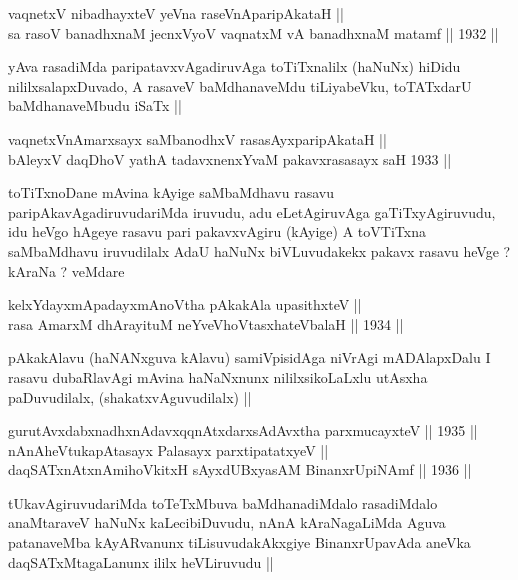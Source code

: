\begin{shl}
vaqnetxV nibadhayxteV yeVna raseVnA\s \s paripAkataH ||  \\
sa rasoV banadhxnaM jecnxVyoV vaqnatxM vA banadhxnaM matamf ||  1932 || 
\end{shl}

\begin{artha}
yAva rasadiMda paripatavxvAgadiruvAga toTiTxnalilx (haNuNx) hiDidu
nililxsalapxDuvado, A rasaveV baMdhanaveMdu tiLiyabeVku, toTATxdarU
baMdhanaveMbudu iSaTx ||
\end{artha}

\begin{shl}
vaqnetxVnA\s \s marxsayx saMbanodhxV rasasAyx\s \s paripAkataH || \\
bAleyxV daqDhoV yathA tadavxnenxYvaM pakavxrasasayx saH 1933 ||  
\end{shl}

\begin{artha}
toTiTxnoDane mAvina kAyige saMbaMdhavu rasavu
paripAkavAgadiruvudariMda iruvudu, adu eLetAgiruvAga gaTiTxyAgiruvudu,
idu heVgo hAgeye rasavu pari pakavxvAgiru (kAyige) A toVTiTxna
saMbaMdhavu iruvudilalx AdaU haNuNx biVLuvudakekx pakavx rasavu heVge
? kAraNa ? veMdare 
\end{artha}

\begin{shl}
kelxYdayxmApadayxmAnoV\s tha pAkakAla upasithxteV || \\
rasa AmarxM dhArayituM neYveVhoVtasxhateV\s balaH ||  1934 ||  
\end{shl}

\begin{artha}
pAkakAlavu (haNANxguva kAlavu) samiVpisidAga niVrAgi mADAlapxDalu I
rasavu dubaRlavAgi mAvina haNaNxnunx nililxsikoLaLxlu utAsxha
paDuvudilalx, (shakatxvAguvudilalx) ||
\end{artha}

\begin{shl}
gurutAvxdabxnadhxnAdavxqqnAtxdarxsAdAvx\s tha parxmucayxteV ||  1935 ||   \\
nAnAheVtukapAtasayx Palasayx parxtipatatxyeV ||  \\
daqSATxnAtxnAmihoVkitxH sAyxdUBxyasAM BinanxrUpiNAmf ||  1936 ||  
\end{shl}

\begin{artha}
tUkavAgiruvudariMda toTeTxMbuva baMdhanadiMdalo rasadiMdalo
anaMtaraveV haNuNx kaLecibiDuvudu, nAnA kAraNagaLiMda Aguva
patanaveMba kAyARvanunx tiLisuvudakAkxgiye BinanxrUpavAda aneVka
daqSATxMtagaLanunx ililx heVLiruvudu ||
\end{artha}


